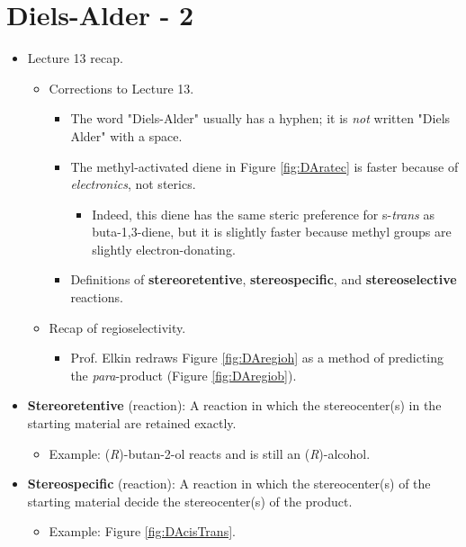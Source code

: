 \documentclass[../notes.tex]{subfiles}
\begin{document}
\section{Diels-Alder - 2}
\begin{itemize}
    \item {}Lecture 13 recap.
    \begin{itemize}
        \item Corrections to Lecture 13.
        \begin{itemize}
            \item The word "Diels-Alder" usually has a hyphen; it is \emph{not} written "Diels Alder" with a space.
            \item The methyl-activated diene in Figure \ref{fig:DAratec} is faster because of \emph{electronics}, not sterics.
            \begin{itemize}
                \item Indeed, this diene has the same steric preference for s-\emph{trans} as buta-1,3-diene, but it is slightly faster because methyl groups are slightly electron-donating.
            \end{itemize}
            \item Definitions of \textbf{stereoretentive}, \textbf{stereospecific}, and \textbf{stereoselective} reactions. 
        \end{itemize}
        \item Recap of regioselectivity.
        \begin{itemize}
            \item Prof. Elkin redraws Figure \ref{fig:DAregioh} as a method of predicting the \emph{para}-product (Figure \ref{fig:DAregiob}).
        \end{itemize}
    \end{itemize}
    \item \textbf{Stereoretentive} (reaction): A reaction in which the stereocenter(s) in the starting material are retained exactly.
    \begin{itemize}
        \item Example: (\emph{R})-butan-2-ol reacts and is still an (\emph{R})-alcohol.
    \end{itemize}
    \item \textbf{Stereospecific} (reaction): A reaction in which the stereocenter(s) of the starting material decide the stereocenter(s) of the product.
    \begin{itemize}
        \item Example: Figure \ref{fig:DAcisTrans}.

\end{itemize}
\end{itemize}
\end{document}
